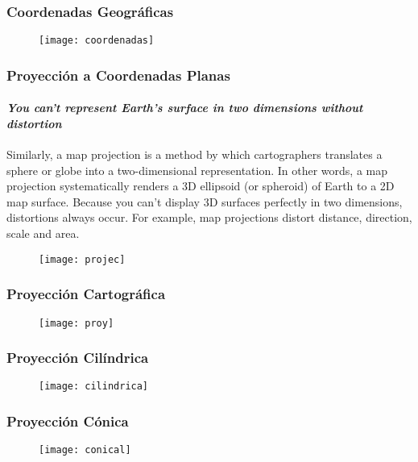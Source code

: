 \documentclass[14pt]{beamer}
\begin{document}
\begin{frame}
\frametitle{Coordenadas Geográficas}
  \begin{figure}
    \centering
    \texttt{[image: coordenadas]}
  \end{figure}
\end{frame}
\begin{frame}
\frametitle{Proyección a Coordenadas Planas}
\framesubtitle{\emph{You can’t represent Earth’s surface in two dimensions without distortion}}
\scriptsize{Similarly, a map projection is a method by which cartographers translates a sphere or globe into a two-dimensional representation. In other words, a map projection systematically renders a 3D ellipsoid (or spheroid) of Earth to a 2D map surface. Because you can’t display 3D surfaces perfectly in two dimensions, distortions always occur. For example, map projections distort distance, direction, scale and area.}
  \begin{figure}
    \centering
    \texttt{[image: projec]}
  \end{figure}
\end{frame}
\begin{frame}
\frametitle{Proyección Cartográfica}
  \begin{figure}
    \centering
    \texttt{[image: proy]}
  \end{figure}
\end{frame}
\begin{frame}
\frametitle{Proyección Cilíndrica}
  \begin{figure}
    \centering
    \texttt{[image: cilindrica]}
  \end{figure}
\end{frame}
\begin{frame}
\frametitle{Proyección Cónica}
  \begin{figure}
    \centering
    \texttt{[image: conical]}
  \end{figure}
\end{frame}
\end{document}
